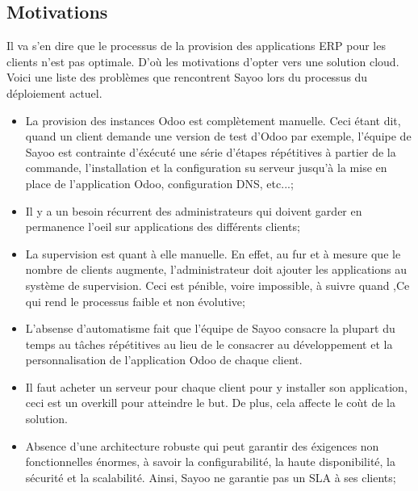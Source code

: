 \begin{onehalfspace}
\subsection{Motivations}

Il va s'en dire que le processus de la provision des applications ERP pour les clients n'est pas optimale. D'où les motivations d'opter vers une solution cloud. Voici une liste des problèmes que rencontrent Sayoo lors du processus du déploiement actuel.

\begin{itemize}

\item La provision des instances Odoo est complètement manuelle. Ceci étant dit, quand un client demande une version de test d'Odoo par exemple, l'équipe de Sayoo est contrainte d'éxécuté une série d'étapes répétitives à partier de la commande, l'installation et la configuration su serveur jusqu'à la mise en place de l'application Odoo, configuration DNS, etc...;

\item Il y a un besoin récurrent des administrateurs qui doivent garder en permanence l'oeil sur applications des différents clients;

\item La supervision est quant à elle manuelle. En effet, au fur et à mesure que le nombre de clients augmente, l'administrateur doit ajouter les applications au système de supervision. Ceci est pénible, voire impossible, à suivre quand ,Ce qui rend le processus faible et non évolutive;

\item L'absense d'automatisme fait que l'équipe de Sayoo consacre la plupart du temps au tâches répétitives au lieu de le consacrer au développement et la personnalisation de l'application Odoo de chaque client. 

\item Il faut acheter un serveur pour chaque client pour y installer son application, ceci est un overkill pour atteindre le but. De plus, cela affecte le coùt de la solution.

\item Absence d'une architecture robuste qui peut garantir des éxigences non fonctionnelles énormes, à savoir la configurabilité, la haute disponibilité, la sécurité et la scalabilité. Ainsi, Sayoo ne garantie pas un SLA à ses clients;

\end{itemize}





\end{onehalfspace}
